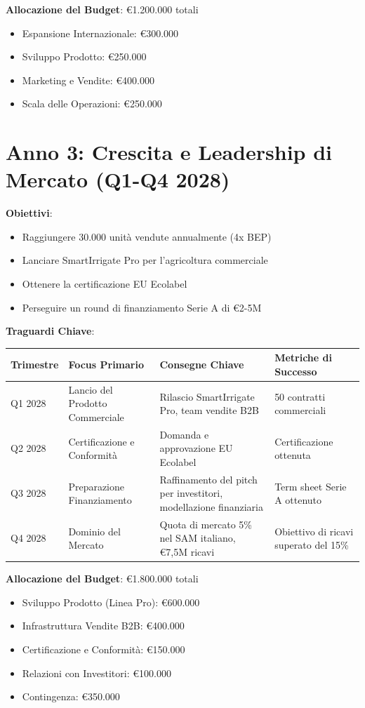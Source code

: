 \documentclass[11pt,a4paper]{report}
\begin{document}
\textbf{Allocazione del Budget}: €1.200.000 totali
\begin{itemize}
    \item Espansione Internazionale: €300.000
    \item Sviluppo Prodotto: €250.000
    \item Marketing e Vendite: €400.000
    \item Scala delle Operazioni: €250.000
\end{itemize}

\section{Anno 3: Crescita e Leadership di Mercato (Q1-Q4 2028)}
\textbf{Obiettivi}:
\begin{itemize}
    \item Raggiungere 30.000 unità vendute annualmente (4x BEP)
    \item Lanciare SmartIrrigate Pro per l'agricoltura commerciale
    \item Ottenere la certificazione EU Ecolabel
    \item Perseguire un round di finanziamento Serie A di €2-5M
\end{itemize}

\textbf{Traguardi Chiave}:

\begin{longtable}{|p{2cm}|p{3cm}|p{3cm}|p{3cm}|}
\hline
\textbf{Trimestre} & \textbf{Focus Primario} & \textbf{Consegne Chiave} & \textbf{Metriche di Successo} \\ \hline
Q1 2028 & Lancio del Prodotto Commerciale & Rilascio SmartIrrigate Pro, team vendite B2B & 50 contratti commerciali \\ \hline
Q2 2028 & Certificazione e Conformità & Domanda e approvazione EU Ecolabel & Certificazione ottenuta \\ \hline
Q3 2028 & Preparazione Finanziamento & Raffinamento del pitch per investitori, modellazione finanziaria & Term sheet Serie A ottenuto \\ \hline
Q4 2028 & Dominio del Mercato & Quota di mercato 5\% nel SAM italiano, €7,5M ricavi & Obiettivo di ricavi superato del 15\% \\ \hline
\end{longtable}

\textbf{Allocazione del Budget}: €1.800.000 totali
\begin{itemize}
    \item Sviluppo Prodotto (Linea Pro): €600.000
    \item Infrastruttura Vendite B2B: €400.000
    \item Certificazione e Conformità: €150.000
    \item Relazioni con Investitori: €100.000
    \item Contingenza: €350.000
\end{itemize}
\end{document}
